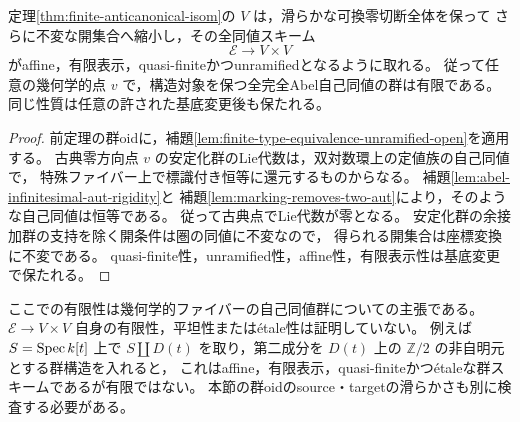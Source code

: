 \begin{corollary}\label{cor:finite-equivalence-unramified}
定理\ref{thm:finite-anticanonical-isom}の $V$ は，滑らかな可換零切断全体を保って
さらに不変な開集合へ縮小し，その全同値スキーム
\[
 \mathcal E\longrightarrow V\times V
\]
がaffine，有限表示，quasi-finiteかつunramifiedとなるように取れる。
従って任意の幾何学的点 $v$ で，構造対象を保つ全完全Abel自己同値の群は有限である。
同じ性質は任意の許された基底変更後も保たれる。
\end{corollary}
\begin{proof}
前定理の群oidに，補題\ref{lem:finite-type-equivalence-unramified-open}を適用する。
古典零方向点 $v$ の安定化群のLie代数は，双対数環上の定値族の自己同値で，
特殊ファイバー上で標識付き恒等に還元するものからなる。
補題\ref{lem:abel-infinitesimal-aut-rigidity}と
補題\ref{lem:marking-removes-two-aut}により，そのような自己同値は恒等である。
従って古典点でLie代数が零となる。
安定化群の余接加群の支持を除く開条件は圏の同値に不変なので，
得られる開集合は座標変換に不変である。
quasi-finite性，unramified性，affine性，有限表示性は基底変更で保たれる。
\end{proof}

\begin{remark}\label{rem:unramified-not-finite-atlas}
ここでの有限性は幾何学的ファイバーの自己同値群についての主張である。
$\mathcal E\to V\times V$ 自身の有限性，平坦性または\'{e}tale性は証明していない。
例えば $S=\operatorname{Spec} k[t]$ 上で $S\amalg D(t)$ を取り，第二成分を
$D(t)$ 上の $\mathbb Z/2$ の非自明元とする群構造を入れると，
これはaffine，有限表示，quasi-finiteかつ\'{e}taleな群スキームであるが有限ではない。
本節の群oidのsource・targetの滑らかさも別に検査する必要がある。
\end{remark}
